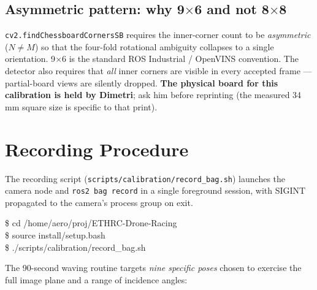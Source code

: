 \documentclass[11pt,a4paper]{article}
\begin{document}
\subsection{Asymmetric pattern: why 9$\times$6 and not 8$\times$8}

\texttt{cv2.findChessboardCornersSB} requires the inner-corner count to be \emph{asymmetric} ($N \neq M$) so that the four-fold rotational ambiguity collapses to a single orientation. 9$\times$6 is the standard ROS Industrial / OpenVINS convention. The detector also requires that \emph{all} inner corners are visible in every accepted frame — partial-board views are silently dropped. \textbf{The physical board for this calibration is held by Dimetri}; ask him before reprinting (the measured 34\,mm square size is specific to that print).

\clearpage

\section{Recording Procedure}

The recording script (\texttt{scripts/calibration/record\_bag.sh}) launches the camera node and \texttt{ros2 bag record} in a single foreground session, with SIGINT propagated to the camera's process group on exit.

\begin{codebox}
\$ cd /home/aero/proj/ETHRC-Drone-Racing\\
\$ source install/setup.bash\\
\$ ./scripts/calibration/record\_bag.sh
\end{codebox}

The 90-second waving routine targets \emph{nine specific poses} chosen to exercise the full image plane and a range of incidence angles:
\end{document}
